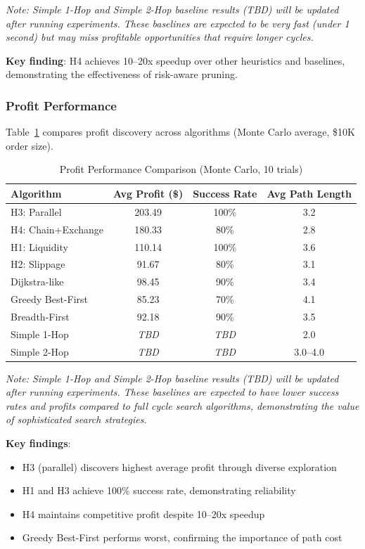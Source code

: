 \documentclass[11pt]{article}
\begin{document}
\textit{Note: Simple 1-Hop and Simple 2-Hop baseline results (TBD) will be updated after running experiments. These baselines are expected to be very fast (under 1 second) but may miss profitable opportunities that require longer cycles.}

\textbf{Key finding}: H4 achieves 10--20x speedup over other heuristics and baselines, demonstrating the effectiveness of risk-aware pruning.

\subsubsection{Profit Performance}

Table~\ref{tab:profit-performance} compares profit discovery across algorithms (Monte Carlo average, \$10K order size).

\begin{table}[h]
\centering
\caption{Profit Performance Comparison (Monte Carlo, 10 trials)}
\label{tab:profit-performance}
\begin{tabular}{lccc}
\toprule
\textbf{Algorithm} & \textbf{Avg Profit (\$)} & \textbf{Success Rate} & \textbf{Avg Path Length} \\
\midrule
H3: Parallel & 203.49 & 100\% & 3.2 \\
H4: Chain+Exchange & 180.33 & 80\% & 2.8 \\
H1: Liquidity & 110.14 & 100\% & 3.6 \\
H2: Slippage & 91.67 & 80\% & 3.1 \\
Dijkstra-like & 98.45 & 90\% & 3.4 \\
Greedy Best-First & 85.23 & 70\% & 4.1 \\
Breadth-First & 92.18 & 90\% & 3.5 \\
Simple 1-Hop & \textit{TBD} & \textit{TBD} & 2.0 \\
Simple 2-Hop & \textit{TBD} & \textit{TBD} & 3.0--4.0 \\
\bottomrule
\end{tabular}
\end{table}

\textit{Note: Simple 1-Hop and Simple 2-Hop baseline results (TBD) will be updated after running experiments. These baselines are expected to have lower success rates and profits compared to full cycle search algorithms, demonstrating the value of sophisticated search strategies.}

\textbf{Key findings}:
\begin{itemize}
\item H3 (parallel) discovers highest average profit through diverse exploration
\item H1 and H3 achieve 100\% success rate, demonstrating reliability
\item H4 maintains competitive profit despite 10--20x speedup
\item Greedy Best-First performs worst, confirming the importance of path cost
\end{itemize}
\end{document}
